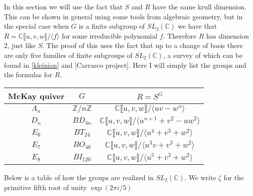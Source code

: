 \documentclass[11pt, a4paper, english]{article}
\numberwithin{prop}{section}
\numberwithin{lemma}{section}
\numberwithin{theorem}{section}
\numberwithin{defin}{section}
\numberwithin{example}{section}
\newcommand{\C}{\mathbb{C}}
\begin{document}
In this section we will use the fact that $S$ and $R$ have the same krull dimension. This can be shown in general using some tools from algebraic geometry, but in the special case when $G$ is a finite subgroup of $SL_2(\C)$ we have that $R = \C \llbracket u, v, w \rrbracket / \langle f \rangle$ for some irreducible polynomial $f$. Therefore $R$ has dimension 2, just like $S$. The proof of this uses the fact that up to a change of basis there are only five families of finite subgroups of $SL_2(\C)$, a survey of which can be found in [\href{https://staff.fnwi.uva.nl/r.r.j.bocklandt/notes/kleinian.pdf}{kleinian}] and [Carrasco project]. Here I will simply list the groups and the formulas for $R$.

\begin{center}
{\renewcommand{\arraystretch}{1.6}
\begin{tabular}{|c|c|c|}
\hline
McKay quiver & $G$ & $R = S^G$\\
\hline\hline
$A_n$ & $\mathbb{Z}/n\mathbb{Z}$ & 
$\C \llbracket u, v, w \rrbracket/\langle uv - w^n \rangle$
\\
\hline
$D_n$ & $BD_{4n}$ & 
$\C \llbracket u, v, w \rrbracket/\langle u^{n+1} + v^2 - uw^2\rangle$
\\
\hline
$E_6$ & $BT_24$ & 
$\C \llbracket u, v, w \rrbracket/\langle u^4 + v^3 + w^2 \rangle$
\\
\hline
$E_7$ & $BO_{48}$ &
$\C \llbracket u, v, w \rrbracket/\langle u^3v + v^3 + w^2 \rangle$
\\
\hline
$E_8$ & $BI_{120}$ &
$\C \llbracket u, v, w \rrbracket/\langle u^5 + v^3 + w^2 \rangle$
\\
\hline
\end{tabular}
}
\end{center}

Below is a table of how the groups are realized in $SL_2(\C)$. We write $\zeta$ for the primitive fifth root of unity $\exp(2\pi i/5)$
\end{document}
